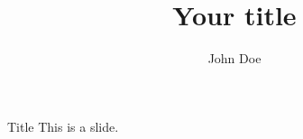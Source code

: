 \documentclass{beamer}
\title{Your title}
\author{John Doe}
\begin{document}
\frame{\maketitle} %

\begin{frame}{Title}
	This is a slide.
\end{frame}
\end{document}
